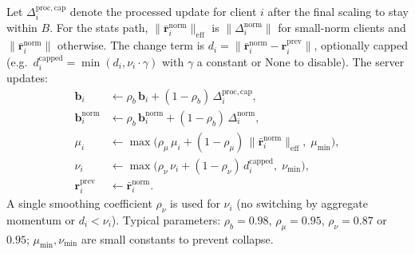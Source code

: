 \documentclass[11pt,a4paper]{article}
\begin{document}
Let $\Delta_i^{\mathrm{proc},\mathrm{cap}}$ denote the processed update for client $i$ after the final scaling to stay within $B$. For the stats path, $\|\bar{\mathbf{r}}_i^{\mathrm{norm}}\|_{\mathrm{eff}}$ is $\|\Delta_i^{\mathrm{norm}}\|$ for small-norm clients and $\|\bar{\mathbf{r}}_i^{\mathrm{norm}}\|$ otherwise. The change term is $d_i = \|\bar{\mathbf{r}}_i^{\mathrm{norm}} - \mathbf{r}_i^{\mathrm{prev}}\|$, optionally capped (e.g.\ $d_i^{\mathrm{capped}} = \min(d_i, \nu_i \cdot \gamma)$ with $\gamma$ a constant or $\mathrm{None}$ to disable). The server updates:
\begin{align}
  \mathbf{b}_i &\leftarrow \rho_b\,\mathbf{b}_i + (1-\rho_b)\,\Delta_i^{\mathrm{proc},\mathrm{cap}}, \\
  \mathbf{b}_i^{\mathrm{norm}} &\leftarrow \rho_b\,\mathbf{b}_i^{\mathrm{norm}} + (1-\rho_b)\,\Delta_i^{\mathrm{norm}}, \\
  \mu_i &\leftarrow \max\bigl(\rho_\mu\,\mu_i + (1-\rho_\mu)\,\|\bar{\mathbf{r}}_i^{\mathrm{norm}}\|_{\mathrm{eff}},\; \mu_{\min}\bigr), \\
  \nu_i &\leftarrow \max\bigl(\rho_\nu\,\nu_i + (1-\rho_\nu)\,d_i^{\mathrm{capped}},\; \nu_{\min}\bigr), \\
  \mathbf{r}_i^{\mathrm{prev}} &\leftarrow \bar{\mathbf{r}}_i^{\mathrm{norm}}.
\end{align}
A single smoothing coefficient $\rho_\nu$ is used for $\nu_i$ (no switching by aggregate momentum or $d_i < \nu_i$). Typical parameters: $\rho_b = 0.98$, $\rho_\mu = 0.95$, $\rho_\nu = 0.87$ or $0.95$; $\mu_{\min},\nu_{\min}$ are small constants to prevent collapse.
\end{document}

